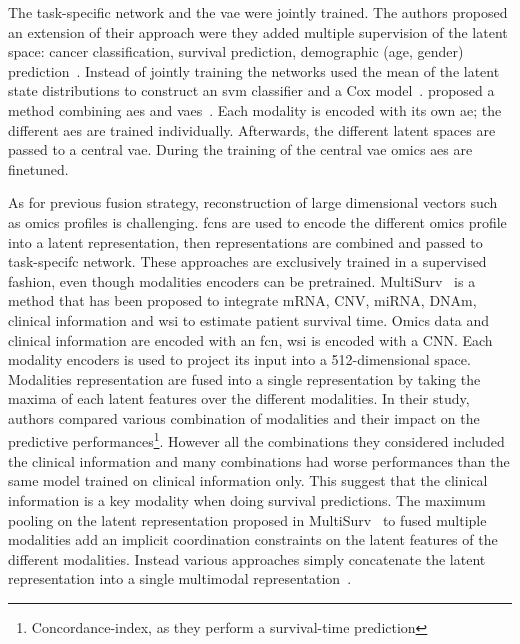 \documentclass[../main.tex]{subfiles}
\begin{document}
			The task-specific network and the \gls{vae} were jointly trained.
			The authors proposed an extension of their approach were they added multiple supervision of the latent space: cancer classification, survival prediction, demographic (age, gender) prediction~\cite{Zhang2021}.
			Instead of jointly training the networks \citeauthor{Hira2021} used the mean of the latent state distributions to construct an \gls{svm} classifier and a Cox model~\cite{Hira2021}.
			\citeauthor{customics} proposed a method combining \glspl{ae} and \glspl{vae}~\cite{customics}.
			Each modality is encoded with its own \gls{ae}; the different \glspl{ae} are trained individually.
			Afterwards, the different latent spaces are passed to a central \gls{vae}.
			During the training of the central \gls{vae} omics \glspl{ae} are finetuned.

			As for previous fusion strategy, reconstruction of large dimensional vectors such as omics profiles is challenging.
			\Glspl{fcn} are used to encode the different omics profile into a latent representation, then representations are combined and passed to task-specifc network.
			These approaches are exclusively trained in a supervised fashion, even though modalities encoders can be pretrained.
			MultiSurv~\cite{MultiSurv} is a method that has been proposed to integrate mRNA, CNV, miRNA, DNAm, clinical information and \gls{wsi} to estimate patient survival time.
			Omics data and clinical information are encoded with an \gls{fcn}, \gls{wsi} is encoded with a CNN.
			Each modality encoders is used to project its input into a 512-dimensional space.
			Modalities representation are fused into a single representation by taking the maxima of each latent features over the different modalities.
			In their study, authors compared various combination of modalities and their impact on the predictive performances\footnote{Concordance-index, as they perform a survival-time prediction}.
			However all the combinations they considered included the clinical information and many combinations had worse performances than the same model trained on clinical information only.
			This suggest that the clinical information is a key modality when doing survival predictions.
			The maximum pooling on the latent representation proposed in MultiSurv~\cite{MultiSurv} to fused multiple modalities add an implicit coordination constraints on the latent features of the different modalities.
			Instead various approaches simply concatenate the latent representation into a single multimodal representation~\cite{MOLI,Lin2020}.
\end{document}
